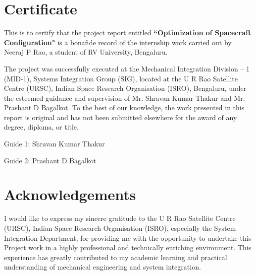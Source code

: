 \documentclass[11pt,a4paper,oneside]{report}
\begin{document}
\setcounter{page}{1}

\chapter*{Certificate}
This is to certify that the project report entitled \textbf{``Optimization of Spacecraft Configuration"} is a bonafide record of the internship work carried out by Neeraj P Rao, a student of RV University, Bengaluru.

The project was successfully executed at the Mechanical Integration Division -- 1 (MID-1), Systems Integration Group (SIG), located at the U R Rao Satellite Centre (URSC), Indian Space Research Organisation (ISRO), Bengaluru, under the esteemed guidance and supervision of Mr. Shravan Kumar Thakur and Mr. Prashant D Bagalkot.
To the best of our knowledge, the work presented in this report is original and has not been submitted elsewhere for the award of any degree, diploma, or title.

\vspace{2cm}
\noindent
\begin{minipage}{0.45\textwidth}
Guide 1: Shravan Kumar Thakur
\end{minipage}
\begin{minipage}{0.45\textwidth}
Guide 2: Prashant D Bagalkot
\end{minipage}

\chapter*{Acknowledgements}
I would like to express my sincere gratitude to the U R Rao Satellite Centre (URSC), Indian Space Research Organisation (ISRO), especially the System Integration Department, for providing me with the opportunity to undertake this Project work in a highly professional and technically enriching environment. This experience has greatly contributed to my academic learning and practical understanding of mechanical engineering and system integration.\\
\\
\end{document}
